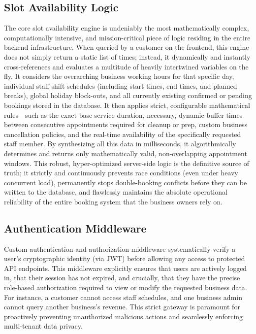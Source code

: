 \subsection{Slot Availability Logic}
The core slot availability engine is undeniably the most mathematically complex, computationally intensive, and mission-critical piece of logic residing in the entire backend infrastructure. When queried by a customer on the frontend, this engine does not simply return a static list of times; instead, it dynamically and instantly cross-references and evaluates a multitude of heavily intertwined variables on the fly. It considers the overarching business working hours for that specific day, individual staff shift schedules (including start times, end times, and planned breaks), global holiday block-outs, and all currently existing confirmed or pending bookings stored in the database. It then applies strict, configurable mathematical rules—such as the exact base service duration, necessary, dynamic buffer times between consecutive appointments required for cleanup or prep, custom business cancellation policies, and the real-time availability of the specifically requested staff member. By synthesizing all this data in milliseconds, it algorithmically determines and returns only mathematically valid, non-overlapping appointment windows. This robust, hyper-optimized server-side logic is the definitive source of truth; it strictly and continuously prevents race conditions (even under heavy concurrent load), permanently stops double-booking conflicts before they can be written to the database, and flawlessly maintains the absolute operational reliability of the entire booking system that the business owners rely on.

\subsection{Authentication Middleware}
Custom authentication and authorization middleware systematically verify a user's cryptographic identity (via JWT) before allowing any access to protected API endpoints. This middleware explicitly ensures that users are actively logged in, that their session has not expired, and crucially, that they have the precise role-based authorization required to view or modify the requested business data. For instance, a customer cannot access staff schedules, and one business admin cannot query another business's revenue. This strict gateway is paramount for proactively preventing unauthorized malicious actions and seamlessly enforcing multi-tenant data privacy.

